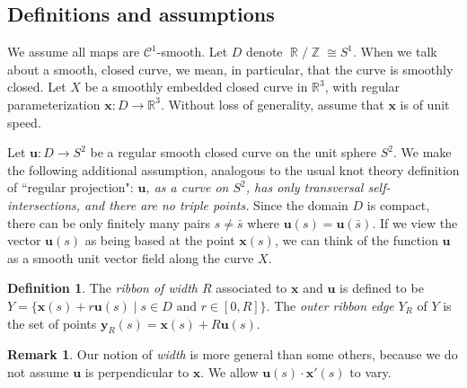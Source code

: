 \documentclass[12pt]{article}
\numberwithin{equation}{subsection}
\theoremstyle{definition}
\newtheorem*{rmk}{Remark}
\newtheorem*{defin}{Definition}
\numberwithin{lem}{section}
\DeclareMathOperator{\R}{\mathbb{R}}
\DeclareMathOperator{\Z}{\mathbb{Z}}
\def\vecu{\mathbf{u}}
\def\uu{\mathbf{u}}
\def\vecx{\mathbf{x}}
\begin{document}

\subsection{Definitions and assumptions}\label{GeneralAssumptions}
We assume all maps are $\mathcal{C}^{1}$-smooth.  Let $D$ denote $\R/\Z \cong S^1$.
When we talk about a smooth, closed curve, we mean, in particular, that the curve is smoothly closed.  Let $X$ be a smoothly embedded closed curve in $\mathbb{R}^3$, with regular parameterization  $\mathbf{x}: D \rightarrow \mathbb{R}^3$.  Without loss of generality, assume that $\mathbf{x}$ is of unit speed.  

Let $\uu: D \rightarrow S^2$ be a regular smooth closed curve on the unit sphere $S^2$. 
We make the following additional assumption, analogous to the usual knot theory definition of ``regular projection": {\em $\uu$, as a curve on $S^2$, has only transversal self-intersections, and there are no triple points.}  Since the domain $D$ is compact, there can be only finitely many pairs $s \neq \bar{s}$ where $\vecu(s) = \vecu(\bar{s})$.  If we view the vector $\vecu(s)$ as being based at the point $\vecx(s)$, we can think of the function $\vecu$ as a smooth unit vector field along the curve $X$.

\begin{defin}  The \emph{ribbon of width $R$} associated to $\mathbf{x}$ and $\mathbf{u}$ is defined to be $Y= \{\mathbf{x}(s) + r\mathbf{u}(s) \;|\; s \in D \mbox{ and } r \in [0, R]\}$.  The \emph{outer ribbon edge} $Y_{R}$  of $Y $ is the set of points $\mathbf{y}_{R}(s) = \mathbf{x}(s) + R\mathbf{u}(s)$.
\end{defin}

\begin{rmk}
Our notion of {\em width} is more general than some others, because we do not assume  $\mathbf{u}$ is perpendicular to $\mathbf{x}$. We allow $\mathbf{u}(s) \cdot \mathbf{x}'(s)$ to vary. 
\end{rmk}


\end{document}
